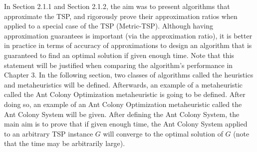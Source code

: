 \documentclass{article}
\begin{document}
In Section 2.1.1 and Section 2.1.2, the aim was to present algorithms that approximate the TSP, and rigorously prove their approximation ratios when applied to a special case of the TSP (Metric-TSP). Although having approximation guarantees is important (via the approximation ratio), it is better in practice in terms of accuracy of approximations to design an algorithm that is guaranteed to find an optimal solution if given enough time. Note that this statement will be justified when comparing the algorithm's performance in Chapter 3. In the following section, two classes of algorithms called the heuristics and metaheuristics will be defined. Afterwards, an example of a metaheuristic called the Ant Colony Optimization metaheuristic is going to be defined. After doing so, an example of an Ant Colony Optimization metaheuristic called the Ant Colony System will be given. After defining the Ant Colony System, the main aim is to prove that if given enough time, the Ant Colony System applied to an arbitrary TSP instance $G$ will converge to the optimal solution of $G$ (note that the time may be arbitrarily large).
\end{document}
